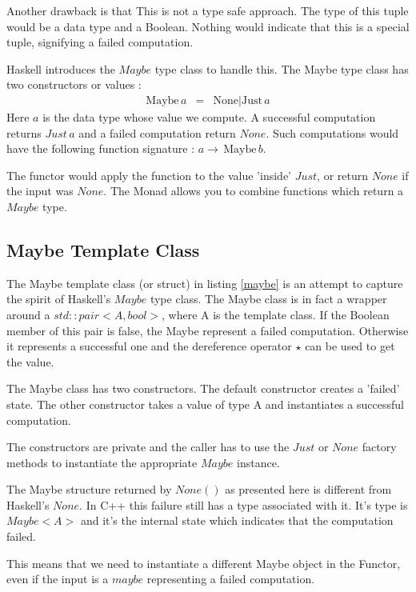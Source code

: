 \documentclass[12pt,fleqn]{article}
\begin{document}
Another drawback is that This is not a type safe approach.
The type of this tuple would be a data type and a Boolean. Nothing would indicate that this is a special tuple, signifying a failed computation.

Haskell introduces the $Maybe$ type class to handle this.
The Maybe type class has two constructors or values :
%
\begin{eqnarray*}
\mbox{Maybe}\, a &=& \mbox{None} | \mbox{Just} \, a
\end{eqnarray*}
%
Here $a$ is the data type whose value we compute.
A successful computation returns $Just \, a$ and a failed computation return $None$.
Such computations would have the following function signature : $ a \rightarrow \, \mbox{Maybe}\, b$.

 
The functor would apply the function to the value 'inside' $Just$, or return $None$ if the input was $None$.
The Monad allows you to combine functions which return a $Maybe$ type.

%
\subsection{Maybe Template Class}
%
%
The Maybe template class (or struct) in listing \ref{maybe} is an attempt to capture the spirit of Haskell's $Maybe$ type class.
The Maybe class is in fact a wrapper around a $std::pair<A,bool>$, where A is the template class.
If the Boolean member of this pair is false, the Maybe represent a failed computation.
Otherwise it represents a successful one and the dereference operator $\star$ can be used to get the value.

The Maybe class has two constructors. The default constructor creates a 'failed' state. 
The other constructor takes a value of type A and instantiates a successful computation.

The constructors are private and the caller has to use the $Just$ or $None$ factory methods to instantiate the appropriate $Maybe$ instance.

The Maybe structure returned by $None()$ as presented here is different from Haskell's $None$. 
In C++ this failure still has a type associated with it. 
It's type is $Maybe<A>$ and it's the internal state which indicates that the computation failed.

This means that we need to instantiate a different  Maybe object in the Functor, 
even if the input is a $maybe$ representing a failed computation.
\end{document}
